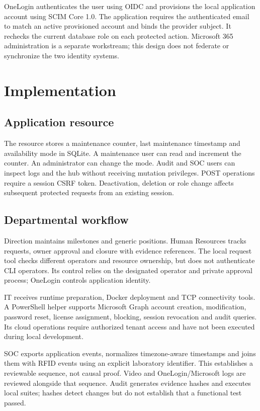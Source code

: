 \documentclass[conference]{IEEEtran}
\begin{document}
OneLogin authenticates the user using OIDC and provisions the local application account using SCIM Core 1.0\cite{oidc,scim}. The application requires the authenticated email to match an active provisioned account and binds the provider subject. It rechecks the current database role on each protected action. Microsoft 365 administration is a separate workstream; this design does not federate or synchronize the two identity systems.

\section{Implementation}
\subsection{Application resource}
The resource stores a maintenance counter, last maintenance timestamp and availability mode in SQLite. A maintenance user can read and increment the counter. An administrator can change the mode. Audit and SOC users can inspect logs and the hub without receiving mutation privileges. POST operations require a session CSRF token. Deactivation, deletion or role change affects subsequent protected requests from an existing session.

\subsection{Departmental workflow}
Direction maintains milestones and generic positions. Human Resources tracks requests, owner approval and closure with evidence references. The local request tool checks different operators and resource ownership, but does not authenticate CLI operators. Its control relies on the designated operator and private approval process; OneLogin controls application identity.

IT receives runtime preparation, Docker deployment and TCP connectivity tools. A PowerShell helper supports Microsoft Graph account creation, modification, password reset, license assignment, blocking, session revocation and audit queries\cite{graph}. Its cloud operations require authorized tenant access and have not been executed during local development.

SOC exports application events, normalizes timezone-aware timestamps and joins them with RFID events using an explicit laboratory identifier. This establishes a reviewable sequence, not causal proof. Video and OneLogin/Microsoft logs are reviewed alongside that sequence. Audit generates evidence hashes and executes local suites; hashes detect changes but do not establish that a functional test passed.
\end{document}
